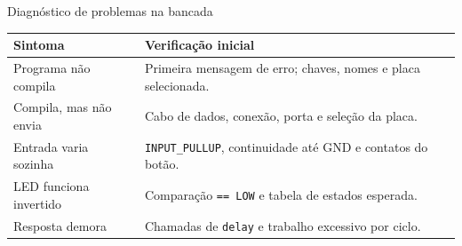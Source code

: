 \begin{frame}[t]{Diagnóstico de problemas na bancada}
\small
\begin{tabularx}{\textwidth}{p{3cm}X}\toprule
Sintoma & Verificação inicial\\\midrule
Programa não compila & Primeira mensagem de erro; chaves, nomes e placa selecionada.\\[0.12cm]
Compila, mas não envia & Cabo de dados, conexão, porta e seleção da placa.\\[0.12cm]
Entrada varia sozinha & \texttt{INPUT\_PULLUP}, continuidade até GND e contatos do botão.\\[0.12cm]
LED funciona invertido & Comparação \texttt{== LOW} e tabela de estados esperada.\\[0.12cm]
Resposta demora & Chamadas de \texttt{delay} e trabalho excessivo por ciclo.\\\bottomrule
\end{tabularx}
\end{frame}
